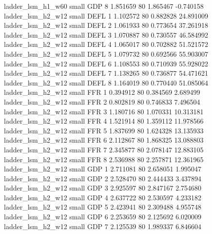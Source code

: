        ladder_lsm_h1_w60      small      GDP                 8 1.851659 80       1.865467          -0.740158
       ladder_lsm_h2_w12      small     DEFL                 1 1.102572 80       0.882828          24.891009
       ladder_lsm_h2_w12      small     DEFL                 2 1.061933 80       0.773654          37.261918
       ladder_lsm_h2_w12      small     DEFL                 3 1.070887 80       0.730557          46.584992
       ladder_lsm_h2_w12      small     DEFL                 4 1.065017 80       0.702882          51.521572
       ladder_lsm_h2_w12      small     DEFL                 5 1.079732 80       0.692566          55.903007
       ladder_lsm_h2_w12      small     DEFL                 6 1.108553 80       0.710939          55.928022
       ladder_lsm_h2_w12      small     DEFL                 7 1.138265 80       0.736877          54.471621
       ladder_lsm_h2_w12      small     DEFL                 8 1.164019 80       0.770440          51.085064
       ladder_lsm_h2_w12      small      FFR                 1 0.394912 80       0.384569           2.689499
       ladder_lsm_h2_w12      small      FFR                 2 0.802819 80       0.746833           7.496504
       ladder_lsm_h2_w12      small      FFR                 3 1.180716 80       1.070331          10.313181
       ladder_lsm_h2_w12      small      FFR                 4 1.521914 80       1.359112          11.978566
       ladder_lsm_h2_w12      small      FFR                 5 1.837699 80       1.624328          13.135933
       ladder_lsm_h2_w12      small      FFR                 6 2.112867 80       1.868325          13.088803
       ladder_lsm_h2_w12      small      FFR                 7 2.345877 80       2.078147          12.883105
       ladder_lsm_h2_w12      small      FFR                 8 2.536988 80       2.257871          12.361965
       ladder_lsm_h2_w12      small      GDP                 1 2.711081 80       2.658051           1.995047
       ladder_lsm_h2_w12      small      GDP                 2 2.528470 80       2.444433           3.437894
       ladder_lsm_h2_w12      small      GDP                 3 2.925597 80       2.847167           2.754680
       ladder_lsm_h2_w12      small      GDP                 4 2.637722 80       2.530597           4.233182
       ladder_lsm_h2_w12      small      GDP                 5 2.423941 80       2.309488           4.955748
       ladder_lsm_h2_w12      small      GDP                 6 2.253659 80       2.125692           6.020009
       ladder_lsm_h2_w12      small      GDP                 7 2.125539 80       1.989337           6.846604
